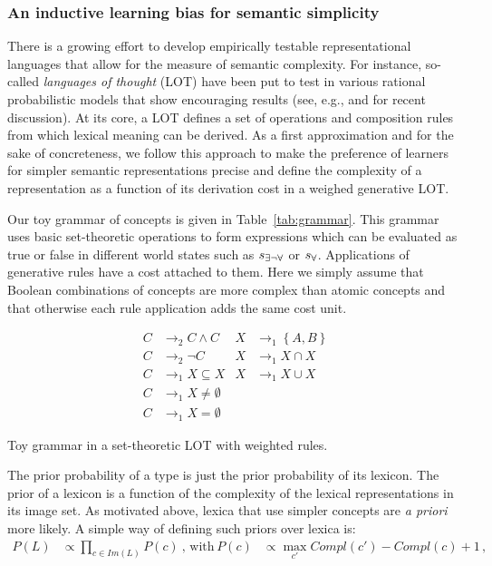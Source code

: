 \documentclass[a4paper, 11pt]{article}
\newcommand{\set}[1]{\left\{#1\right\}}
\newcommand{\state}{\ensuremath{s}\xspace}		%
\newcommand{\mystate}[1]{\ensuremath{\state_{\text{#1}}}\xspace} %
\newcommand{\ssome}{\mystate{\ensuremath{\exists\neg\forall}}}
\newcommand{\sall}{\mystate{\ensuremath{\forall}}}
\begin{document}
\subsubsection{An inductive learning bias for semantic simplicity}
There is a growing effort to develop empirically  testable representational  languages that allow for the measure of semantic complexity. For instance, so-called {\em languages of thought} (LOT) have been put to test in various rational probabilistic models that show encouraging results (see, e.g., \citealt{katz+etal:2008, piantadosi+etal:underreview, piantadosi+etal:2012a} and \citealt{piantadosi+jacobs:2016} for recent discussion). At its core, a LOT defines a set of operations and composition rules from which lexical meaning can be derived. As a first approximation and for the sake of concreteness, we follow this approach to make the preference of learners for simpler semantic representations precise and define the complexity of a representation as a function of its derivation cost in a weighed generative LOT.

Our toy grammar of concepts is given in Table~\ref{tab:grammar}. This grammar uses basic set-theoretic operations to form expressions which can be evaluated as true or false in different world states such as $\ssome$ or $\sall$. Applications of generative  rules have a cost attached to them. Here we simply assume that Boolean combinations of concepts are more complex than atomic concepts and that otherwise each rule application adds the same cost unit.
\begin{table}
  \centering
  \begin{align*}
    C & \rightarrow_2 C \wedge C 
    & 
    X & \rightarrow_1 \set{A,B} \\
    C & \rightarrow_2 \neg C 
    & 
    X & \rightarrow_1 X \cap X \\
    C & \rightarrow_1 X \subseteq X
    & 
    X & \rightarrow_1 X \cup X \\
    C & \rightarrow_1 X \neq \emptyset \\
    C & \rightarrow_1 X = \emptyset     
  \end{align*}
  \caption{Toy grammar in a set-theoretic LOT with weighted rules.}
  \label{tab:grammar}
\end{table}


The prior probability of a type is just the prior probability of its lexicon. The prior of a lexicon is a function of the complexity of the lexical representations in its image set. As motivated above, lexica that use simpler concepts are \emph{a priori} more likely. A simple way of defining such priors over lexica is:
\begin{align*}
  P(L)  & \propto \prod_{c \in Im(L)} P(c)   \ \text{, with} & 
  P(c) & \propto \max_{c'}Compl(c') - Compl(c) + 1\,,
\end{align*}
\end{document}
